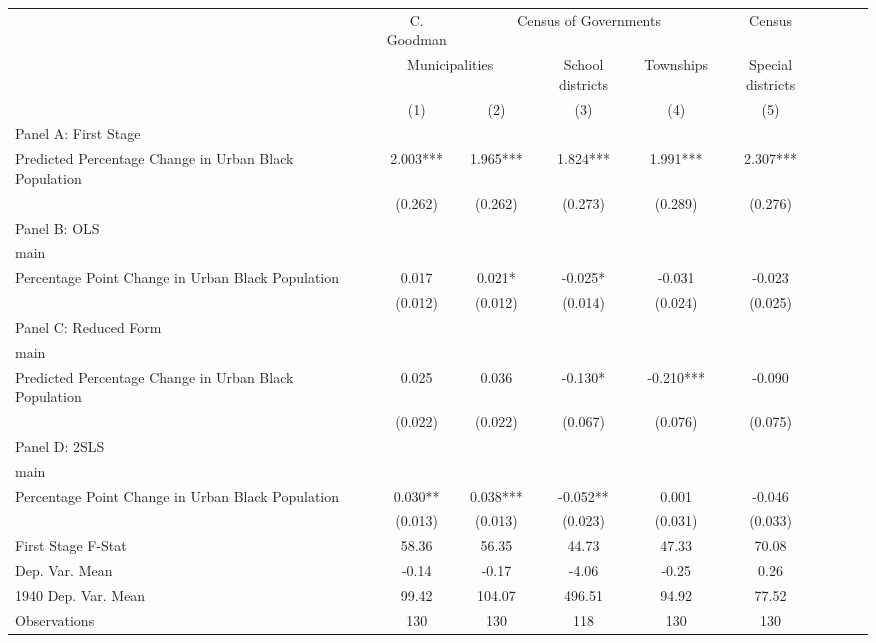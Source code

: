  \begin{tabular}{l*{8}{c}} \toprule
&\multicolumn{1}{c}{C. Goodman}&\multicolumn{3}{c}{Census of Governments}&\multicolumn{1}{c}{Census}\\\cmidrule(lr){2-2}\cmidrule(lr){3-5}\cmidrule(lr){6-6}
&\multicolumn{2}{c}{Municipalities}&\multicolumn{1}{c}{School districts}&\multicolumn{1}{c}{Townships}&\multicolumn{1}{c}{Special districts}&\\\cmidrule(lr){2-3}\cmidrule(lr){4-5}\cmidrule(lr){6-6}
&\multicolumn{1}{c}{(1)}&\multicolumn{1}{c}{(2)}&\multicolumn{1}{c}{(3)}&\multicolumn{1}{c}{(4)}&\multicolumn{1}{c}{(5)}\\
\cmidrule(lr){1-6}
\multicolumn{5}{l}{Panel A: First Stage}\\
\cmidrule(lr){1-6}
Predicted Percentage Change in Urban Black Population&    2.003***&    1.965***&    1.824***&    1.991***&    2.307***\\
                &  (0.262)   &  (0.262)   &  (0.273)   &  (0.289)   &  (0.276)   \\
\cmidrule(lr){1-6}
\multicolumn{5}{l}{Panel B: OLS}\\
\cmidrule(lr){1-6}
main            &            &            &            &            &            \\
Percentage Point Change in Urban Black Population&    0.017   &    0.021*  &   -0.025*  &   -0.031   &   -0.023   \\
                &  (0.012)   &  (0.012)   &  (0.014)   &  (0.024)   &  (0.025)   \\
\cmidrule(lr){1-6}
\multicolumn{5}{l}{Panel C: Reduced Form}\\
\cmidrule(lr){1-6}
main            &            &            &            &            &            \\
Predicted Percentage Change in Urban Black Population&    0.025   &    0.036   &   -0.130*  &   -0.210***&   -0.090   \\
                &  (0.022)   &  (0.022)   &  (0.067)   &  (0.076)   &  (0.075)   \\
\cmidrule(lr){1-6}
\multicolumn{5}{l}{Panel D: 2SLS}\\
\cmidrule(lr){1-6}
main            &            &            &            &            &            \\
Percentage Point Change in Urban Black Population&    0.030** &    0.038***&   -0.052** &    0.001   &   -0.046   \\
                &  (0.013)   &  (0.013)   &  (0.023)   &  (0.031)   &  (0.033)   \\
\midrule
First Stage F-Stat&    58.36   &    56.35   &    44.73   &    47.33   &    70.08   \\
Dep. Var. Mean  &    -0.14   &    -0.17   &    -4.06   &    -0.25   &     0.26   \\
1940 Dep. Var. Mean&    99.42   &   104.07   &   496.51   &    94.92   &    77.52   \\
Observations    &      130   &      130   &      118   &      130   &      130   \\
 \bottomrule \end{tabular}
